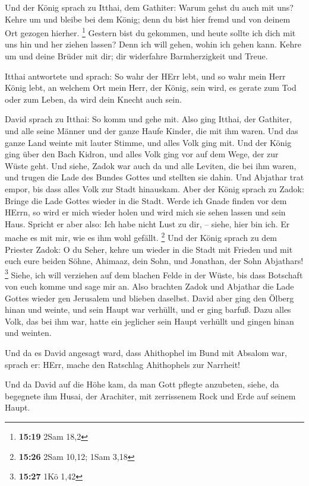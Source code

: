  Und der König sprach zu Itthai, dem Gathiter: Warum gehst
du auch mit uns? Kehre um und bleibe bei dem König; denn du bist hier
fremd und von deinem Ort gezogen hierher. \footnote{\textbf{15:19} 2Sam
  18,2}  Gestern bist du gekommen, und heute sollte ich
dich mit uns hin und her ziehen lassen? Denn ich will gehen, wohin ich
gehen kann. Kehre um und deine Brüder mit dir; dir widerfahre
Barmherzigkeit und Treue.

 Itthai antwortete und sprach: So wahr der HErr lebt, und
so wahr mein Herr König lebt, an welchem Ort mein Herr, der König, sein
wird, es gerate zum Tod oder zum Leben, da wird dein Knecht auch sein.

 David sprach zu Itthai: So komm und gehe mit. Also ging
Itthai, der Gathiter, und alle seine Männer und der ganze Haufe Kinder,
die mit ihm waren.  Und das ganze Land weinte mit lauter
Stimme, und alles Volk ging mit. Und der König ging über den Bach
Kidron, und alles Volk ging vor auf dem Wege, der zur Wüste geht.
 Und siehe, Zadok war auch da und alle Leviten, die bei ihm
waren, und trugen die Lade des Bundes Gottes und stellten sie dahin. Und
Abjathar trat empor, bis dass alles Volk zur Stadt hinauskam.
 Aber der König sprach zu Zadok: Bringe die Lade Gottes
wieder in die Stadt. Werde ich Gnade finden vor dem HErrn, so wird er
mich wieder holen und wird mich sie sehen lassen und sein Haus.
 Spricht er aber also: Ich habe nicht Lust zu dir, --
siehe, hier bin ich. Er mache es mit mir, wie es ihm wohl gefällt.
\footnote{\textbf{15:26} 2Sam 10,12; 1Sam 3,18}  Und der
König sprach zu dem Priester Zadok: O du Seher, kehre um wieder in die
Stadt mit Frieden und mit euch eure beiden Söhne, Ahimaaz, dein Sohn,
und Jonathan, der Sohn Abjathars! \footnote{\textbf{15:27} 1Kö 1,42}
 Siehe, ich will verziehen auf dem blachen Felde in der
Wüste, bis dass Botschaft von euch komme und sage mir an. 
Also brachten Zadok und Abjathar die Lade Gottes wieder gen Jerusalem
und blieben daselbst.  David aber ging den Ölberg hinan und
weinte, und sein Haupt war verhüllt, und er ging barfuß. Dazu alles
Volk, das bei ihm war, hatte ein jeglicher sein Haupt verhüllt und
gingen hinan und weinten.

 Und da es David angesagt ward, dass Ahithophel im Bund mit
Absalom war, sprach er: HErr, mache den Ratschlag Ahithophels zur
Narrheit!

 Und da David auf die Höhe kam, da man Gott pflegte
anzubeten, siehe, da begegnete ihm Husai, der Arachiter, mit zerrissenem
Rock und Erde auf seinem Haupt.

